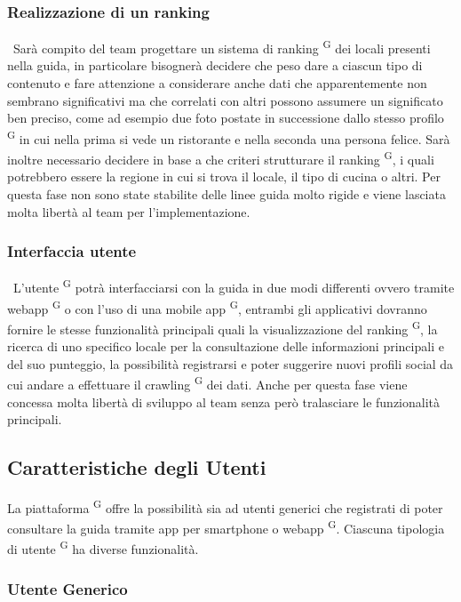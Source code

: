 \subsubsection{Realizzazione di un ranking} \ 
Sarà compito del team progettare un sistema di ranking \textsuperscript{G} dei locali presenti nella guida, in particolare bisognerà decidere che peso dare a ciascun tipo di contenuto e fare attenzione a considerare anche dati che apparentemente non sembrano significativi ma che correlati con altri possono assumere un significato ben preciso, come ad esempio due foto postate in successione dallo stesso profilo \textsuperscript{G} in cui nella prima si vede un ristorante e nella seconda una persona felice. Sarà inoltre necessario decidere in base a che criteri strutturare il ranking \textsuperscript{G}, i quali potrebbero essere la regione in cui si trova il locale, il tipo di cucina o altri. Per questa fase non sono state stabilite delle linee guida molto rigide e viene lasciata molta libertà al team per l’implementazione.

\subsubsection{Interfaccia utente} \ 
L’utente \textsuperscript{G} potrà interfacciarsi con la guida in due modi differenti ovvero tramite webapp \textsuperscript{G} o con l’uso di una mobile app \textsuperscript{G}, entrambi gli applicativi dovranno fornire le stesse funzionalità principali quali la visualizzazione del ranking \textsuperscript{G}, la ricerca di uno specifico locale per la consultazione delle informazioni principali e del suo punteggio, la possibilità registrarsi e poter suggerire nuovi profili social da cui andare a effettuare il crawling \textsuperscript{G} dei dati.
Anche per questa fase viene concessa molta libertà di sviluppo al team senza però tralasciare le funzionalità principali.

\subsection{Caratteristiche degli Utenti}

La piattaforma \textsuperscript{G} offre la possibilità sia ad utenti generici che registrati di poter consultare la guida tramite app per smartphone o webapp \textsuperscript{G}. Ciascuna tipologia di utente \textsuperscript{G} ha diverse funzionalità.

\subsubsection{Utente Generico} \ 

